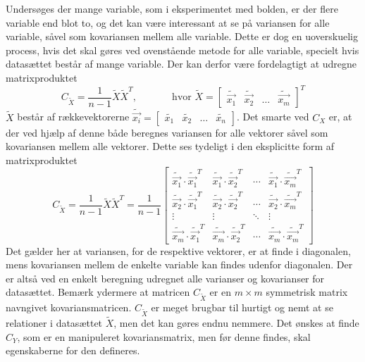 Undersøges der mange variable, som i eksperimentet med bolden, er der flere variable end blot to, og det kan være interessant at se på variansen for alle variable, såvel som kovariansen mellem alle variable. Dette er dog en uoverskuelig process, hvis det skal gøres ved ovenstående metode for alle variable, specielt hvis datasættet består af mange variable. Der kan derfor være fordelagtigt at udregne matrixproduktet
\begin{equation}
C_{\tilde{X}}= \frac{1}{n-1} \tilde{X}\tilde{X}^T, \phantom{mmmm} \text{hvor } \tilde{X}= \begin{bmatrix} \tilde{\vec{x_1}}  & \tilde{\vec{x_2}} & \hdots	 & \tilde{\vec{x_m}} \end{bmatrix}^T
\label{eq:matrix covarians}
\end{equation}
$\tilde{X}$ består af rækkevektorerne $\tilde{\vec{x_i}}=\begin{bmatrix} \tilde{x_1} & \tilde{x_2} & \hdots & \tilde{x_n} \end{bmatrix}$.
Det smarte ved $C_X$ er, at der ved hjælp af denne både beregnes variansen for alle vektorer såvel som kovariansen mellem alle vektorer. Dette ses tydeligt i den eksplicitte form af matrixproduktet
\begin{equation}
C_{\tilde{X}}=\frac{1}{n-1} \tilde{X}\tilde{X}^T = \frac{1}{n-1} 
\begin{bmatrix}
\tilde{\vec{x_1}} \cdot {\tilde{\vec{x_1}}}^T		& \tilde{\vec{x_1}} \cdot {\tilde{\vec{x_2}}}^T	&	\cdots	&	\tilde{\vec{x_1}} \cdot {\tilde{\vec{x_m}}}^T		\\
\tilde{\vec{x_2}} \cdot {\tilde{\vec{x_1}}}^T		& \tilde{\vec{x_2}} \cdot {\tilde{\vec{x_2}}}^T	&	\cdots	&	\tilde{\vec{x_2}} \cdot {\tilde{\vec{x_m}}}^T		\\
\vdots											& \vdots											&	\ddots	&			\vdots											\\
\tilde{\vec{x_m}} \cdot {\tilde{\vec{x_1}}}^T		& \tilde{\vec{x_m}} \cdot {\tilde{\vec{x_2}}}^T	&	\cdots	&	\tilde{\vec{x_m}} \cdot {\tilde{\vec{x_m}}}^T
\end{bmatrix}
\end{equation}
Det gælder her at variansen, for de respektive vektorer, er at finde i diagonalen, mens kovariansen mellem de enkelte variable kan findes udenfor diagonalen. Der er altså ved en enkelt beregning udregnet alle varianser og kovarianser for datasættet. Bemærk ydermere at matricen $C_{\tilde{X}}$ er en $m \times m$ symmetrisk matrix navngivet kovariansmatricen. $C_{\tilde{X}}$ er meget brugbar til hurtigt og nemt at se relationer i datasættet $\tilde{X}$, men det kan gøres endnu nemmere. Det ønskes at finde $C_Y$, som er en manipuleret kovariansmatrix, men før denne findes, skal egenskaberne for den defineres.

